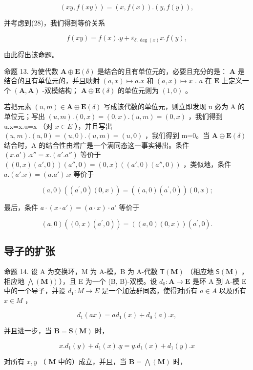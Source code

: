 \[
(x y, f (x y)) = (x, f (x)). (y, f (y)),
\]

并考虑到(28)，我们得到等价关系

\[
f (x y) = f (x). y + \varepsilon_ {\delta , \deg (x)} x. f (y),
\]

由此得出该命题。

命题 13. 为使代数 \(\mathbf{A} \oplus \mathbf{E}(\delta)\) 是结合的且有单位元的，必要且充分的是： \(\mathbf{A}\) 是结合的且有单位元的，并且映射 \((a, x) \mapsto a.x\) 和 \((a, x) \mapsto x\) . \(a\) 在 \(\mathbf{E}\) 上定义一个 \((\mathbf{A}, \mathbf{A})\) -双模结构； \(\mathbf{A} \oplus \mathbf{E}(\delta)\) 的单位元则为 \((1, 0)\) 。

若把元素 \((u,m)\in\mathbf{A}\oplus\mathbf{E}(\delta)\) 写成该代数的单位元，则立即发现 u 必为 A 的单位元；写出 \((u,m).(0,x)=(0,x).(u,m)=(0,x)\) ，我们得到 u.x=x.u=x （对 \(x\in E\) ），并且写出 \((u,m).(u,0)=(u,0).(u,m)=(u,0)\) ，我们得到 m=0。当 \(\mathbf{A}\oplus\mathbf{E}(\delta)\) 结合时，A 的结合性由增广是一个满同态这一事实得出。条件 \((x.a') .a''=x.(a'.a'')\) 等价于 \(((0,x)(a',0))(a'',0)=(0,x)((a',0)(a'',0))\) ，类似地，条件 \(a.(a'.x)=(a.a').x\) 等价于

\[
(a, 0) ((a ^ {\prime}, 0) (0, x)) = ((a, 0) (a ^ {\prime}, 0)) (0, x);
\]

最后，条件 \(a \cdot (x \cdot a') = (a \cdot x) \cdot a'\) 等价于

\[
(a, 0) ((0, x) (a ^ {\prime}, 0)) = ((a, 0) (0, x)) (a ^ {\prime}, 0).
\]

\subsection{导子的扩张}

命题 14. 设 A 为交换环，M 为 A-模，B 为 A-代数 \(\mathsf{T}(\mathbf{M})\) （相应地 \(\mathsf{S}(\mathbf{M})\) ，相应地 \(\bigwedge (\mathbf{M}))\) ），且 E 为一个 (B, B)-双模。设 \(d_0: \mathbf{A} \to \mathbf{E}\) 是环 A 到 A-模 E 中的一个导子，并设 \(d_{1}:M\to E\) 是一个加法群同态，使得对所有 \(a\in A\) 以及所有 \(x\in M\) ，

\[
d _ {1} (a x) = a d _ {1} (x) + d _ {0} (a). x,\tag{29}
\]

并且进一步，当 \(\mathbf{B} = \mathbf{S}(\mathbf{M})\) 时，

\[
x. d _ {1} (y) + d _ {1} (x). y = y. d _ {1} (x) + d _ {1} (y). x\tag{30}
\]

对所有 \(x, y\) （ \(\mathbf{M}\) 中的）成立，并且，当 \(\mathbf{B} = \bigwedge (\mathbf{M})\) 时，

